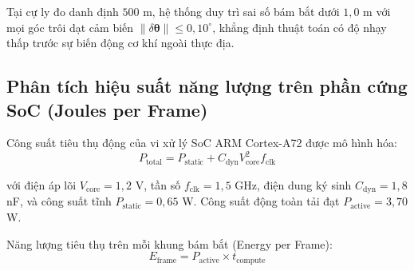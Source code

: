 Tại cự ly đo danh định $500$ m, hệ thống duy trì sai số bám bắt dưới $1{,}0$ m với mọi góc trôi dạt cảm biến $\|\delta\boldsymbol{\theta}\| \le 0{,}10^\circ$, khẳng định thuật toán có độ nhạy thấp trước sự biến động cơ khí ngoài thực địa.

\subsection{Phân tích hiệu suất năng lượng trên phần cứng SoC (Joules per Frame)}

\hspace{0.5cm} Công suất tiêu thụ động của vi xử lý SoC ARM Cortex-A72 được mô hình hóa:
\begin{equation}
P_{\text{total}} = P_{\text{static}} + C_{\text{dyn}} V_{\text{core}}^2 f_{\text{clk}}
\label{eq:soc-power-dissipation-formula}
\end{equation}

với điện áp lõi $V_{\text{core}} = 1{,}2$ V, tần số $f_{\text{clk}} = 1{,}5$ GHz, điện dung ký sinh $C_{\text{dyn}} = 1{,}8$ nF, và công suất tĩnh $P_{\text{static}} = 0{,}65$ W. Công suất động toàn tải đạt $P_{\text{active}} = 3{,}70$ W.

Năng lượng tiêu thụ trên mỗi khung bám bắt (Energy per Frame):
\begin{equation}
E_{\text{frame}} = P_{\text{active}} \times t_{\text{compute}}
\label{eq:energy-per-frame-formula-w14}
\end{equation}

\begin{table}[H]
\centering
\caption{Ước lượng lý thuyết năng lượng tiêu thụ trên mỗi khung đo giữa các giải thuật lọc theo mô hình công suất động}
\label{tab:energy-per-frame-comparison}
\end{table}

